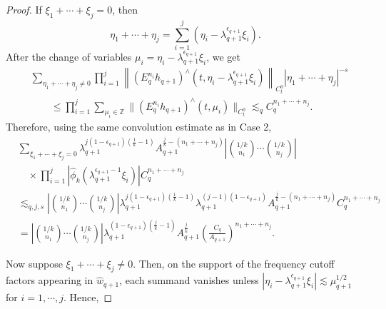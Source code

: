 \documentclass[12pt,reqno,letterpaper]{amsart}
\numberwithin{equation}{section}
\newcommand{\1}{{\bf 1}}
\newcommand{\2}{{\bf 2}}
\newcommand{\Z}{\mathbb Z}
\theoremstyle{remark}
\theoremstyle{remark}
\begin{document}
\begin{proof}
If $\xi_1+\cdots+\xi_j=0$, then
\[
    \eta_1+\cdots+\eta_j
    =
    \sum_{i=1}^j
    \left(\eta_i-\lambda_{q+1}^{\epsilon_{q+1}}\xi_i\right).
\]
After the change of variables $\mu_i=\eta_i-\lambda_{q+1}^{\epsilon_{q+1}}\xi_i$, we get
\[
\begin{aligned}
&\sum_{\eta_1+\cdots+\eta_j\neq0}
\prod_{i=1}^j
\left\|
\left(E_q^{n_i}h_{q+1}\right)^\wedge
\left(t,\eta_i-\lambda_{q+1}^{\epsilon_{q+1}}\xi_i\right)
\right\|_{C_t^0}
|\eta_1+\cdots+\eta_j|^{-s}
\\
&\qquad\le
\prod_{i=1}^j\sum_{\mu_i \in \Z}
\|(E_q^{n_i}h_{q+1})^\wedge(t,\mu_i)\|_{C_t^0}
\lesssim_q
C_q^{n_1+\cdots+n_j}.
\end{aligned}
\]
Therefore, using the same convolution estimate as in Case 2,
\begin{equation}\label{eq:page_29_est}
    \begin{split}
        &\sum_{\xi_1+\cdots+\xi_j=0}
\lambda_{q+1}^{j(1-\epsilon_{q+1})(\frac1k-1)}
A_{q+1}^{\frac jk-(n_1+\cdots+n_j)}
\left|\binom{1/k}{n_1}\cdots\binom{1/k}{n_j}\right|
\\
&\quad\times
\prod_{i=1}^j
\left|
\hat{\phi}_k
\left(\lambda_{q+1}^{\epsilon_{q+1}-1}\xi_i\right)
\right|
C_q^{n_1+\cdots+n_j}
\\
&\lesssim_{q,j,s}
\left|\binom{1/k}{n_1}\cdots\binom{1/k}{n_j}\right|
\lambda_{q+1}^{j(1-\epsilon_{q+1})(\frac1k-1)}
\lambda_{q+1}^{(j-1)(1-\epsilon_{q+1})}
A_{q+1}^{\frac jk-(n_1+\cdots+n_j)}
C_q^{n_1+\cdots+n_j}
\\
&=
\left|\binom{1/k}{n_1}\cdots\binom{1/k}{n_j}\right|
\lambda_{q+1}^{(1-\epsilon_{q+1})(\frac jk-1)}
A_{q+1}^{\frac jk}
\left(\frac{C_q}{A_{q+1}}\right)^{n_1+\cdots+n_j}.
    \end{split}
\end{equation}

Now suppose $\xi_1+\cdots+\xi_j\neq0$. Then, on the support of the frequency cutoff factors appearing in $\hat{w}_{q+1}$, each summand vanishes unless $\left|\eta_i-\lambda_{q+1}^{\epsilon_{q+1}}\xi_i \right| \lesssim \mu_{q+1}^{1/2}$ for $i=1,\cdots,j$. Hence,


\end{proof}
\end{document}

